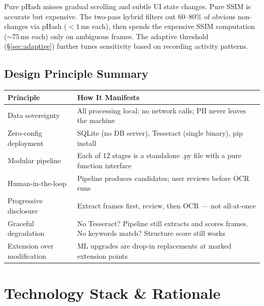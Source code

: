 \documentclass[12pt, a4paper]{article}
\begin{document}
Pure pHash misses gradual scrolling and subtle UI state changes. Pure SSIM is accurate but expensive. The two-pass hybrid filters out 60--80\% of obvious non-changes via pHash ($< 1$\,ms each), then spends the expensive SSIM computation ($\sim$75\,ms each) only on ambiguous frames. The adaptive threshold (\S\ref{sec:adaptive}) further tunes sensitivity based on recording activity patterns.

\subsection{Design Principle Summary}

\begin{longtable}{@{} p{4cm} p{10cm} @{}}
    \toprule
    \textbf{Principle} & \textbf{How It Manifests} \\
    \midrule
    \endhead
    Data sovereignty & All processing local; no network calls; PII never leaves the machine \\
    Zero-config deployment & SQLite (no DB server), Tesseract (single binary), pip install \\
    Modular pipeline & Each of 12 stages is a standalone .py file with a pure function interface \\
    Human-in-the-loop & Pipeline produces candidates; user reviews before OCR runs \\
    Progressive disclosure & Extract frames first, review, then OCR --- not all-at-once \\
    Graceful degradation & No Tesseract? Pipeline still extracts and scores frames. No keywords match? Structure score still works \\
    Extension over modification & ML upgrades are drop-in replacements at marked extension points \\
    \bottomrule
\end{longtable}

\section{Technology Stack \& Rationale}
\end{document}
